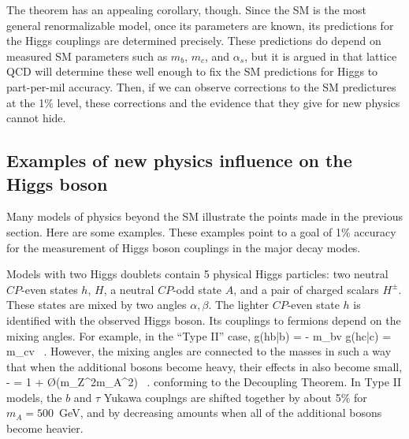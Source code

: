 The theorem has an appealing corollary, though.   Since the SM is the most general renormalizable model, once its parameters are known, its predictions for the Higgs couplings are determined precisely.   These predictions do depend on measured SM parameters such as $m_b$, $m_c$, and $\alpha_s$, but  it is argued in \cite{Lepage:2014fla} that  
lattice QCD will determine these well enough to fix the SM predictions for Higgs to part-per-mil accuracy.   Then, if we can observe corrections to the SM predictures at the 1\% level, these corrections and the evidence that they give for new physics cannot hide.

\subsection{Examples of  new physics influence on the Higgs boson}
\label{subsec:newphysicofH}

Many models of physics beyond the SM illustrate the points made in the previous section. Here are some examples.   These examples point to  a goal of 1\% accuracy
for the measurement of Higgs boson couplings in the major decay modes.

Models with two Higgs doublets contain 5 physical Higgs particles: two  neutral $CP$-even states $h$, $H$,  a neutral $CP$-odd state $A$, and a pair of charged scalars $H^\pm$.  These states are mixed by two angles $\alpha, \beta$. The lighter
$CP$-even state $h$ is identified with the observed Higgs boson.  Its couplings to 
fermions depend on the mixing angles.   For example, in the ``Type II'' case, 
\beq
   g(hb\bar b) = - {\sin\alpha\over \cos\beta}{m_b\over v}  \quad   g(hc\bar c) =  {\cos\alpha\over \sin\beta}{m_c\over v}   \ .
However, the mixing angles are connected to the masses in such a way that when the additional bosons become heavy, their effects in  also become small,
\beq
     - {\sin\alpha\over \cos\beta} =  1 + \O({m_Z^2\over m_A^2}) \ .
\eeqn
conforming to the Decoupling Theorem.   In Type II models, the $b$ and $\tau$ Yukawa couplngs are shifted together by about 5\% for $m_A = 500$~GeV, and by decreasing amounts when all of the additional bosons become heavier.

